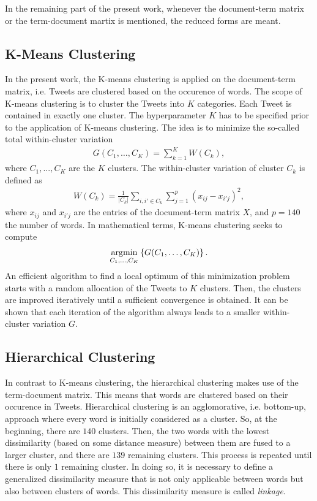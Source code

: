 In the remaining part of the present work, whenever the document-term matrix or the term-document martix is mentioned, the reduced forms are meant.

\subsection{K-Means Clustering}\label{subsec:k_means}
In the present work, the K-means clustering is applied on the document-term matrix, i.e. Tweets are clustered based on the occurence of words. The scope of K-means clustering is to cluster the Tweets into $K$ categories. Each Tweet is contained in exactly one cluster. The hyperparameter $K$ has to be specified prior to the application of K-means clustering. The idea is to minimize the so-called total within-cluster variation
\begin{align*}
	G(C_1,\dots,C_K) =  \sum_{k=1}^{K} W(C_k),
\end{align*}
where $C_1,...,C_K$ are the $K$ clusters. The within-cluster variation of cluster $C_k$ is defined as
\begin{align*}
	W(C_k) = \frac{1}{|C_k|} \sum_{i, i' \in C_k} \sum_{j=1}^p (x_{ij} - x_{i'j})^2,
\end{align*}
where $x_{ij}$ and $x_{i'j}$ are the entries of the document-term matrix $X$, and $p=140$ the number of words. In mathematical terms, K-means clustering seeks to compute
\begin{align*}
	\operatorname*{argmin}_{C_1,\dots,C_K} \left\{G(C_1,\dots,C_K) \right\}.
\end{align*}
An efficient algorithm to find a local optimum of this minimization problem starts with a random allocation of the Tweets to $K$ clusters. Then, the clusters are improved iteratively until a sufficient convergence is obtained. It can be shown that each iteration of the algorithm always leads to a smaller within-cluster variation $G$.

\subsection{Hierarchical Clustering}\label{subsec:h_clust}
In contrast to K-means clustering, the hierarchical clustering makes use of the term-document matrix. This means that words are clustered based on their occurence in Tweets. Hierarchical clustering is an agglomorative, i.e. bottom-up, approach where every word is initially considered as a cluster. So, at the beginning, there are $140$ clusters. Then, the two words with the lowest dissimilarity (based on some distance measure) between them are fused to a larger cluster, and there are $139$ remaining clusters. This process is repeated until there is only $1$ remaining cluster. In doing so, it is necessary to define a generalized dissimilarity measure that is not only applicable between words but also between clusters of words. This dissimilarity measure is called \textit{linkage}.